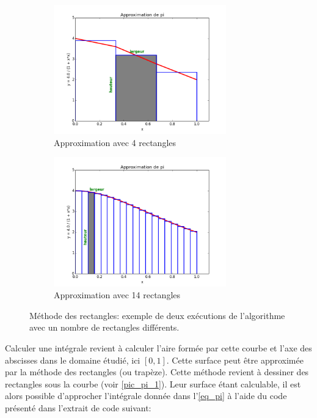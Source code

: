         \begin{figure}[t!]
            \centering
            \begin{subfigure}[t]{0.5\textwidth}
                \centering
                \includegraphics[height=2.2in]{images/Chapitre1/pic_pi_rect_1.png}
                \caption{\label{pic_pi_1} Approximation avec 4 rectangles}
            \end{subfigure}%
        \begin{subfigure}[t]{0.5\textwidth}
                \centering
                \includegraphics[height=2.2in]{images/Chapitre1/pic_pi_rect_2.png}
                \caption{Approximation avec 14 rectangles}
            \end{subfigure}
            \caption{\label{pic_pi_2} Méthode des rectangles: exemple de deux exécutions de l'algorithme avec un nombre de rectangles différents.}
            \label{pic_pi_rect}
        \end{figure}
            
        Calculer une intégrale revient à calculer l'aire formée par cette courbe et l'axe des abscisses dans le domaine étudié, ici $[0,1]$. Cette surface peut être approximée par la méthode des rectangles (ou trapèze). Cette méthode revient à dessiner des rectangles sous la courbe (voir \autoref{pic_pi_1}). Leur surface étant calculable, il est alors possible d'approcher l'intégrale donnée dans l'\autoref{eq_pi} à l'aide du code présenté dans l'extrait de code suivant:
        
